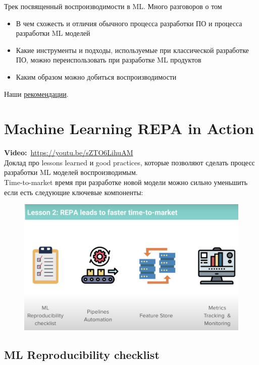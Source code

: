 Трек посвященный воспроизводимости в ML. 
Много разговоров о том
\begin{itemize}
    \item В чем схожесть и отличия обычного процесса разработки ПО и процесса разработки ML моделей
    \item Какие инструменты и подходы, используемые при классической разработке ПО, можно переиспользовать при разработке ML продуктов
    \item Каким образом можно добиться воспроизводимости
\end{itemize}

\begin{remark}
    Наши \href{https://paper.dropbox.com/doc/Reproducible-Research-Draft--A7_r_i5_5DxZO4k9GQMzGWu3AQ-AfvEwFDcTF6lG0nWrdPWj}{рекомендации}.
\end{remark}

\section{Machine Learning REPA in Action}

\textbf{Video:}~\url{https://youtu.be/sZTO6LihuAM} \\

Доклад про lessons learned и good practices, которые позволяют сделать процесс разработки ML моделей воспроизводимым. \\

Time-to-market время при разработке новой модели можно сильно уменьшить если есть следующие ключевые компоненты:
\begin{figure}[ht]
    \centering
    \includegraphics[width=0.8\linewidth]{images/repa.png}
\end{figure}

\subsection{ML Reproducibility checklist}

